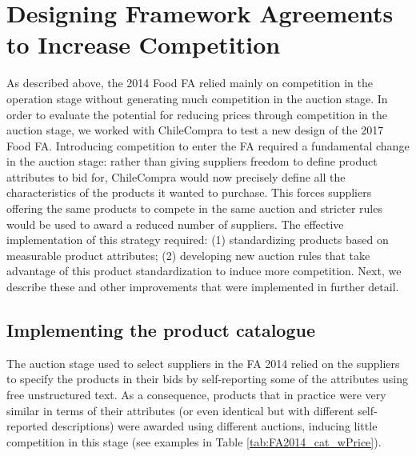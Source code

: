 \section{Designing Framework Agreements to Increase Competition}\label{sec:designFA}


%

As described above, the 2014 Food FA relied mainly on competition in the operation stage without generating much competition in the auction stage. In order to evaluate the potential for reducing prices through competition in the auction stage, we worked with ChileCompra to test a new design of the 2017 Food FA. Introducing competition to enter the FA required a fundamental change in the auction stage: rather than giving suppliers freedom to define product attributes to bid for, ChileCompra would now precisely define all the characteristics of the products it wanted to purchase. This forces suppliers offering the same products to compete in the same auction and stricter rules would be used to award a reduced number of suppliers. The effective implementation of this strategy required: (1) standardizing products based on measurable product attributes; (2) developing new auction rules that take advantage of this product standardization to induce more competition. Next, we describe these and other improvements that were implemented in further detail. 

\subsection{Implementing the product catalogue} \label{sec:standardization}

The auction stage used to select suppliers in the FA 2014 relied on the suppliers to specify the products in their bids by self-reporting some of the attributes using free unstructured text. As a consequence, products that in practice were very similar in terms of their attributes (or even identical but with different self-reported descriptions) were awarded using different auctions, inducing little competition in this stage (see examples in Table \ref{tab:FA2014_cat_wPrice}). 

